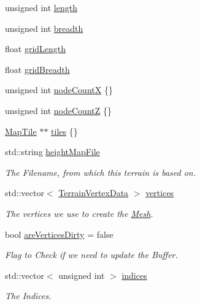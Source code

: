 \begin{DoxyCompactItemize}
\item 
unsigned int \mbox{\hyperlink{classpiolot_1_1_terrain_adfe24e50e102f6c0dd424e2e7f376f15}{length}}
\item 
unsigned int \mbox{\hyperlink{classpiolot_1_1_terrain_a05c6d7e235fafccc8aaa300fb63dfc27}{breadth}}
\item 
float \mbox{\hyperlink{classpiolot_1_1_terrain_ac1378a19d70d35bcafa1ac2c9e443d98}{grid\+Length}}
\item 
float \mbox{\hyperlink{classpiolot_1_1_terrain_ac825eeb29fe45a95909488a560ac8331}{grid\+Breadth}}
\item 
unsigned int \mbox{\hyperlink{classpiolot_1_1_terrain_af2671f954c4fa1be2228ccf4cb631abf}{node\+CountX}} \{\}
\item 
unsigned int \mbox{\hyperlink{classpiolot_1_1_terrain_a584b5d99c115bcfae303b3feea50c3a5}{node\+CountZ}} \{\}
\item 
\mbox{\hyperlink{classpiolot_1_1_map_tile}{Map\+Tile}} $\ast$$\ast$ \mbox{\hyperlink{classpiolot_1_1_terrain_a092c31b5d881c4f89dac30cd887d1664}{tiles}} \{\}
\item 
std\+::string \mbox{\hyperlink{classpiolot_1_1_terrain_a75cfcac6fb95fb3c63def8362ce393d0}{height\+Map\+File}}
\begin{DoxyCompactList}\small\item\em The Filename, from which this terrain is based on. \end{DoxyCompactList}\item 
std\+::vector$<$ \mbox{\hyperlink{structpiolot_1_1_terrain_vertex_data}{Terrain\+Vertex\+Data}} $>$ \mbox{\hyperlink{classpiolot_1_1_terrain_a57bd2f1b451a1d670bc5f42134ecf2c0}{vertices}}
\begin{DoxyCompactList}\small\item\em The vertices we use to create the \mbox{\hyperlink{classpiolot_1_1_mesh}{Mesh}}. \end{DoxyCompactList}\item 
bool \mbox{\hyperlink{classpiolot_1_1_terrain_a0d8413db780f4ef041fd1794631ef122}{are\+Vertices\+Dirty}} = false
\begin{DoxyCompactList}\small\item\em Flag to Check if we need to update the Buffer. \end{DoxyCompactList}\item 
std\+::vector$<$ unsigned int $>$ \mbox{\hyperlink{classpiolot_1_1_terrain_a3f6ce2a18736eccd598931c72aeaf4bc}{indices}}
\begin{DoxyCompactList}\small\item\em The Indices. \end{DoxyCompactList}\item 
$$
\end{DoxyCompactItemize}
